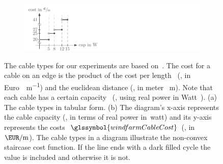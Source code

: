 \begin{figure}[tb!]
    \begin{subfigure}{.45\textwidth}
      \vspace{0.41cm}
        
      \vspace{0.4cm}
      \caption{}
      \label{ch:wfcp:tbl:cabletypes}
    \end{subfigure}
    \hfill
    \begin{subfigure}{.45\textwidth}
      \hspace{0.5cm}
      \includegraphics{windfarmplacement/figures/cable-types-stair-case-function.pdf}
      \caption{}
      \label{ch:wfcp:fig:cabletypes}
    \end{subfigure}
    \caption[An example set of cable types.]{The cable types for our experiments
    are based on~\textcite{berzan}. The cost for a cable on an edge is the
    product of the cost per length~ (\eg, in
    Euro~\si{\EUR\per\metre}) and the euclidean distance (\eg, in meter~
    \si{\metre}). Note that each cable has a certain capacity~
     (\eg, using real
    power in Watt~\si{}). (a) The cable types in tabular form.
    (b) The diagram's x-axis represents the cable capacity (\eg, in terms of
    real power in~\gls{watt}) and its y-axis represents the costs~$
    \glssymbol{windfarmCableCost}$ (\eg, in~$\si{\EUR\per\metre}$). The cable
    types in a diagram illustrate the non-convex staircase cost function. If the
    line ends with a dark filled cycle the value is included and otherwise it is
    not.}
    \label{ch:wfcp:tbl:fig:cabletypes}
\end{figure}
%  
